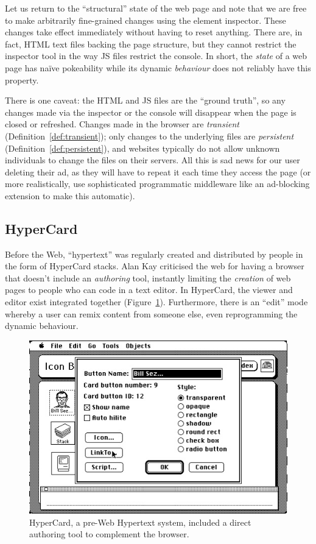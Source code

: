 \documentclass[ twoside,openright,titlepage,numbers=noenddot,headinclude,footinclude,cleardoublepage=empty,abstract=on,
                BCOR=5mm,paper=a4,fontsize=11pt
                ]{scrreprt}
\theoremstyle{definition}
\begin{document}
Let us return to the ``structural'' state of the web page and note that
we are free to make arbitrarily fine-grained changes using the element
inspector. These changes take effect immediately without having to reset
anything. There are, in fact, HTML text files backing the page
structure, but they cannot restrict the inspector tool in the way
\ac{JS} files restrict the console. In short, the \emph{state} of a web
page has naïve pokeability while its dynamic \emph{behaviour} does not
reliably have this property.

There is one caveat: the HTML and \ac{JS} files are the ``ground
truth'', so any changes made via the inspector or the console will
disappear when the page is closed or refreshed. Changes made in the
browser are \emph{transient} (Definition~\ref{def:transient}); only
changes to the underlying files are \emph{persistent}
(Definition~\ref{def:persistent}), and websites typically do not allow
unknown individuals to change the files on their servers. All this is
sad news for our user deleting their ad, as they will have to repeat it
each time they access the page (or more realistically, use sophisticated
programmatic middleware like an ad-blocking extension to make this
automatic).

\hypertarget{hypercard}{\subsection{HyperCard}\label{hypercard}}

Before the Web, ``hypertext'' was regularly created and distributed by
people in the form of HyperCard stacks. Alan Kay criticised the web for
having a browser that doesn't include an \emph{authoring} tool,
instantly limiting the \emph{creation} of web pages to people who can
code in a text editor. In HyperCard, the viewer and editor exist
integrated together (Figure~\ref{fig:hypercard}). Furthermore, there is
an ``edit'' mode whereby a user can remix content from someone else,
even reprogramming the dynamic behaviour.

\begin{figure}
\centering
\includegraphics[width=\linewidth]{hypercard.jpg}
\caption[HyperCard]{HyperCard, a pre-Web Hypertext system, included a direct authoring tool to complement the browser.}
\label{fig:hypercard}
\end{figure}
\end{document}
